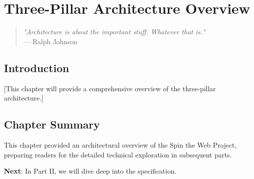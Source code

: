 
\chapter{Three-Pillar Architecture Overview}
\label{chap:architecture}

\begin{quote}
\textit{"Architecture is about the important stuff. Whatever that is."} \\
— Ralph Johnson
\end{quote}

\section{Introduction}

[This chapter will provide a comprehensive overview of the three-pillar architecture.]

\section{Chapter Summary}

This chapter provided an architectural overview of the Spin the Web Project, preparing readers for the detailed technical exploration in subsequent parts.

\textbf{Next}: In Part II, we will dive deep into the \wbdl{} specification.
